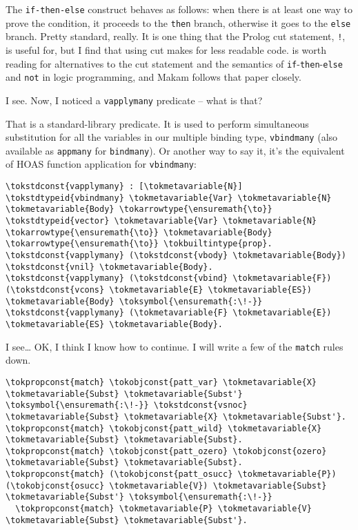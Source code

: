 \noindent
The \texttt{if-then-else} construct behaves as follows: when there is at
least one way to prove the condition, it proceeds to the \texttt{then}
branch, otherwise it goes to the \texttt{else} branch. Pretty standard,
really. It is one thing that the Prolog cut statement, \texttt{!}, is
useful for, but I find that using cut makes for less readable code.
\citet{kiselyov05backtracking} is worth reading for alternatives to the
cut statement and the semantics of
\texttt{if}-\texttt{then}-\texttt{else} and \texttt{not} in logic
programming, and Makam follows that paper closely.

\heroSTUDENT{} I see. Now, I noticed a \texttt{vapplymany} predicate -- what
is that?

\heroADVISOR{} That is a standard-library predicate. It is used to perform
simultaneous substitution for all the variables in our multiple binding
type, \texttt{vbindmany} (also available as \texttt{appmany} for
\texttt{bindmany}). Or another way to say it, it's the equivalent of
HOAS function application for \texttt{vbindmany}:

\begin{verbatim}
\tokstdconst{vapplymany} : [\tokmetavariable{N}] \tokstdtypeid{vbindmany} \tokmetavariable{Var} \tokmetavariable{N} \tokmetavariable{Body} \tokarrowtype{\ensuremath{\to}} \tokstdtypeid{vector} \tokmetavariable{Var} \tokmetavariable{N} \tokarrowtype{\ensuremath{\to}} \tokmetavariable{Body} \tokarrowtype{\ensuremath{\to}} \tokbuiltintype{prop}.
\tokstdconst{vapplymany} (\tokstdconst{vbody} \tokmetavariable{Body}) \tokstdconst{vnil} \tokmetavariable{Body}.
\tokstdconst{vapplymany} (\tokstdconst{vbind} \tokmetavariable{F}) (\tokstdconst{vcons} \tokmetavariable{E} \tokmetavariable{ES}) \tokmetavariable{Body} \toksymbol{\ensuremath{:\!-}} \tokstdconst{vapplymany} (\tokmetavariable{F} \tokmetavariable{E}) \tokmetavariable{ES} \tokmetavariable{Body}.
\end{verbatim}

\heroSTUDENT{} I see\ldots{} OK, I think I know how to continue. I will write
a few of the \texttt{match} rules down.

\begin{verbatim}
\tokpropconst{match} \tokobjconst{patt_var} \tokmetavariable{X} \tokmetavariable{Subst} \tokmetavariable{Subst'} \toksymbol{\ensuremath{:\!-}} \tokstdconst{vsnoc} \tokmetavariable{Subst} \tokmetavariable{X} \tokmetavariable{Subst'}.
\tokpropconst{match} \tokobjconst{patt_wild} \tokmetavariable{X} \tokmetavariable{Subst} \tokmetavariable{Subst}.
\tokpropconst{match} \tokobjconst{patt_ozero} \tokobjconst{ozero} \tokmetavariable{Subst} \tokmetavariable{Subst}.
\tokpropconst{match} (\tokobjconst{patt_osucc} \tokmetavariable{P}) (\tokobjconst{osucc} \tokmetavariable{V}) \tokmetavariable{Subst} \tokmetavariable{Subst'} \toksymbol{\ensuremath{:\!-}}
  \tokpropconst{match} \tokmetavariable{P} \tokmetavariable{V} \tokmetavariable{Subst} \tokmetavariable{Subst'}.
\end{verbatim}

